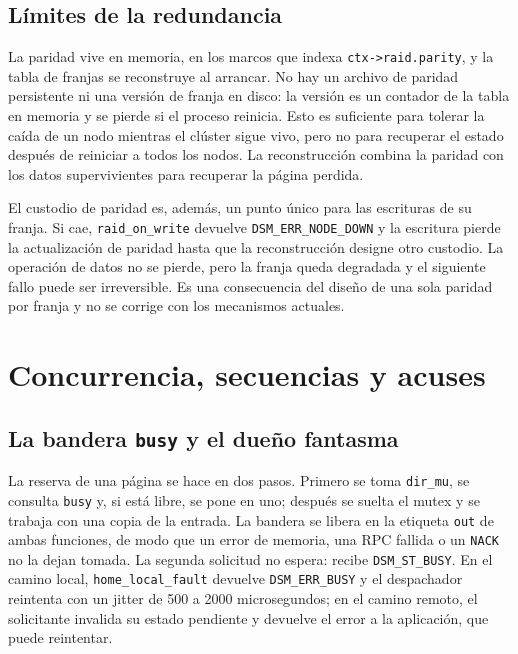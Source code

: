 \documentclass[11pt,spanish]{article}
\begin{document}
\subsection{Límites de la redundancia}

La paridad vive en memoria, en los marcos que indexa \texttt{ctx->raid.parity}, y la tabla de franjas se reconstruye al arrancar. No hay un archivo de paridad persistente ni una versión de franja en disco: la versión es un contador de la tabla en memoria y se pierde si el proceso reinicia. Esto es suficiente para tolerar la caída de un nodo mientras el clúster sigue vivo, pero no para recuperar el estado después de reiniciar a todos los nodos. La reconstrucción combina la paridad con los datos supervivientes para recuperar la página perdida.

El custodio de paridad es, además, un punto único para las escrituras de su franja. Si cae, \texttt{raid\_on\_write} devuelve \texttt{DSM\_ERR\_NODE\_DOWN} y la escritura pierde la actualización de paridad hasta que la reconstrucción designe otro custodio. La operación de datos no se pierde, pero la franja queda degradada y el siguiente fallo puede ser irreversible. Es una consecuencia del diseño de una sola paridad por franja y no se corrige con los mecanismos actuales.

\section{Concurrencia, secuencias y acuses}\label{sec:concurrencia}

\subsection{La bandera \texttt{busy} y el dueño fantasma}

La reserva de una página se hace en dos pasos. Primero se toma \texttt{dir\_mu}, se consulta \texttt{busy} y, si está libre, se pone en uno; después se suelta el mutex y se trabaja con una copia de la entrada. La bandera se libera en la etiqueta \texttt{out} de ambas funciones, de modo que un error de memoria, una RPC fallida o un \texttt{NACK} no la dejan tomada. La segunda solicitud no espera: recibe \texttt{DSM\_ST\_BUSY}. En el camino local, \texttt{home\_local\_fault} devuelve \texttt{DSM\_ERR\_BUSY} y el despachador reintenta con un jitter de 500 a 2000 microsegundos; en el camino remoto, el solicitante invalida su estado pendiente y devuelve el error a la aplicación, que puede reintentar.
\end{document}
